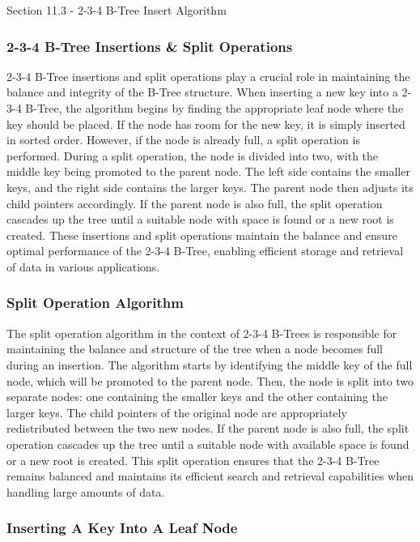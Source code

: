 \begin{notes}{Section 11.3 - 2-3-4 B-Tree Insert Algorithm}
    \subsubsection*{2-3-4 B-Tree Insertions \& Split Operations}

    2-3-4 B-Tree insertions and split operations play a crucial role in maintaining the balance and integrity of the B-Tree structure. When inserting a new key into a 2-3-4 B-Tree, the algorithm begins by finding the appropriate leaf node where the key should be placed. If the node has room for the new key, it is simply inserted in sorted order. 
    However, if the node is already full, a split operation is performed. During a split operation, the node is divided into two, with the middle key being promoted to the parent node. The left side contains the smaller keys, and the right side contains the larger keys. The parent node then adjusts its child pointers accordingly. If the parent node is 
    also full, the split operation cascades up the tree until a suitable node with space is found or a new root is created. These insertions and split operations maintain the balance and ensure optimal performance of the 2-3-4 B-Tree, enabling efficient storage and retrieval of data in various applications.
    
    \subsubsection*{Split Operation Algorithm}
    
    The split operation algorithm in the context of 2-3-4 B-Trees is responsible for maintaining the balance and structure of the tree when a node becomes full during an insertion. The algorithm starts by identifying the middle key of the full node, which will be promoted to the parent node. Then, the node is split into two separate nodes: one containing
    the smaller keys and the other containing the larger keys. The child pointers of the original node are appropriately redistributed between the two new nodes. If the parent node is also full, the split operation cascades up the tree until a suitable node with available space is found or a new root is created. This split operation ensures 
    that the 2-3-4 B-Tree remains balanced and maintains its efficient search and retrieval capabilities when handling large amounts of data.
    
    \subsubsection*{Inserting A Key Into A Leaf Node}
    

\end{notes}
